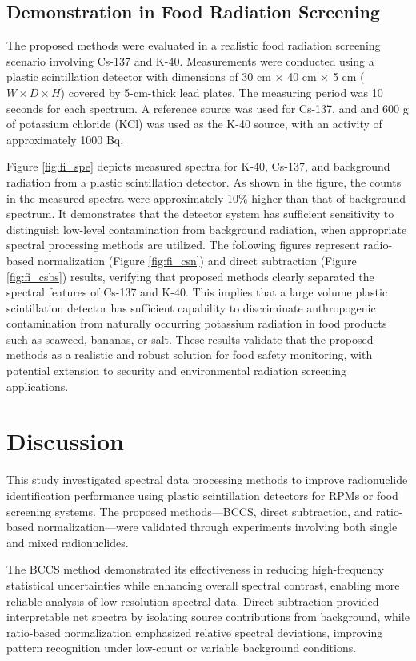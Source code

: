 \documentclass[10pt]{wlscirep}
\begin{document}
\subsection*{Demonstration in Food Radiation Screening}

The proposed methods were evaluated in a realistic food radiation screening scenario involving Cs-137 and K-40. Measurements were conducted using a plastic scintillation detector with dimensions of 30 cm $\times$ 40 cm $\times$ 5 cm ($W \times D \times H$) covered by 5-cm-thick lead plates. The measuring period was 10 seconds for each spectrum. A reference source was used for Cs-137, and and 600 g of potassium chloride (KCl) was used as the K-40 source, with an activity of approximately 1000 Bq.

Figure \ref{fig:fi_spe} depicts measured spectra for K-40, Cs-137, and background radiation from a plastic scintillation detector. As shown in the figure, the counts in the measured spectra were approximately 10\% higher than that of background spectrum. It demonstrates that the detector system has sufficient sensitivity to distinguish low-level contamination from background radiation, when appropriate spectral processing methods are utilized. The following figures represent radio-based normalization (Figure \ref{fig:fi_csn}) and direct subtraction (Figure \ref{fig:fi_csbs}) results, verifying that proposed methods clearly separated the spectral features of Cs-137 and K-40. This implies that a large volume plastic scintillation detector has sufficient capability to discriminate anthropogenic contamination from naturally occurring potassium radiation in food products such as seaweed, bananas, or salt. These results validate that the proposed methods as a realistic and robust solution for food safety monitoring, with potential extension to security and environmental radiation screening applications.

\section*{Discussion}

This study investigated spectral data processing methods to improve radionuclide identification performance using plastic scintillation detectors for RPMs or food screening systems. The proposed methods—BCCS, direct subtraction, and ratio-based normalization—were validated through experiments involving both single and mixed radionuclides.

The BCCS method demonstrated its effectiveness in reducing high-frequency statistical uncertainties while enhancing overall spectral contrast, enabling more reliable analysis of low-resolution spectral data. Direct subtraction provided interpretable net spectra by isolating source contributions from background, while ratio-based normalization emphasized relative spectral deviations, improving pattern recognition under low-count or variable background conditions.
\end{document}
